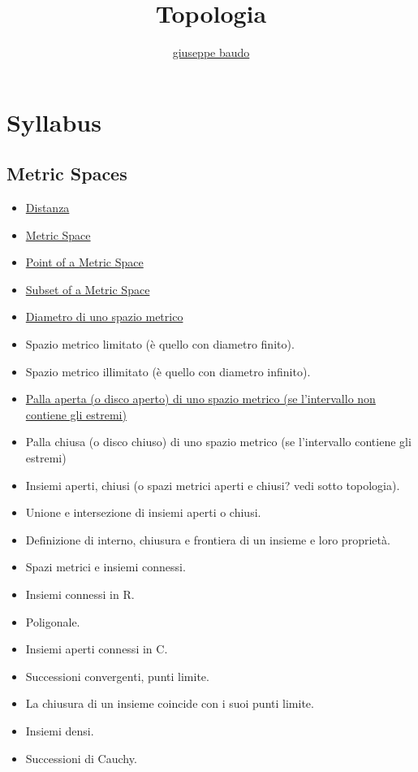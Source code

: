 \documentclass[a4paper,10pt]{article}
\title{Topologia}
\author{\href{http://www.baudo.hol.es}{giuseppe baudo}}
\begin{document}
\maketitle

\section*{Syllabus}
\subsection*{Metric Spaces}
  \begin{itemize}
    \item \href{Distanza.pdf}{Distanza}
    \item \href{MetricSpace.pdf}{Metric Space}
    \item \href{PointMetricSpace.pdf}{Point of a Metric Space}
    \item \href{SubsetMetricSpace.pdf}{Subset of a Metric Space}
    \item \href{DiametroSpazioMetrico.pdf}{Diametro di uno spazio metrico} 
    \item Spazio metrico limitato (è quello con diametro finito).
    \item Spazio metrico illimitato (è quello con diametro infinito). 
    \item \href{PallaAperta.pdf}{Palla aperta (o disco aperto) di uno spazio metrico (se l'intervallo non contiene gli estremi)}
    \item Palla chiusa (o disco chiuso) di uno spazio metrico (se l'intervallo contiene gli estremi)
    \item Insiemi aperti, chiusi (o spazi metrici aperti e chiusi? vedi sotto topologia). 
    \item Unione e intersezione di insiemi aperti o chiusi. 
    \item Definizione di interno, chiusura e frontiera di un insieme e loro proprietà. 
    \item Spazi metrici e insiemi connessi. 
    \item Insiemi connessi in R. 
    \item Poligonale.
    \item Insiemi aperti connessi in C. 
    \item Successioni convergenti, punti limite. 
    \item La chiusura di un insieme coincide con i suoi punti limite. 
    \item Insiemi densi. 
    \item Successioni di Cauchy.

\end{itemize}
\end{document}
